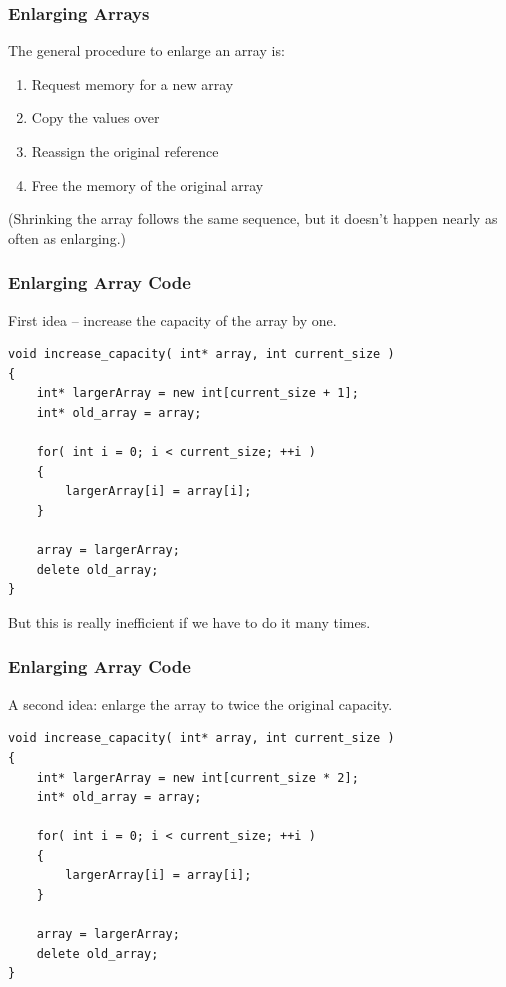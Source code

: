 \begin{frame}
\frametitle{Enlarging Arrays}
The general procedure to enlarge an array is:

\begin{enumerate}
	\item Request memory for a new array
 	\item Copy the values over
	\item Reassign the original reference
	\item Free the memory of the original array
\end{enumerate}

(Shrinking the array follows the same sequence, but it doesn't happen nearly as often as enlarging.)

\end{frame}

\begin{frame}[fragile]
\frametitle{Enlarging Array Code}

First idea -- increase the capacity of the array by one.

\begin{verbatim}
void increase_capacity( int* array, int current_size )
{
    int* largerArray = new int[current_size + 1];
    int* old_array = array;
    
    for( int i = 0; i < current_size; ++i )
    {
        largerArray[i] = array[i];
    }
    
    array = largerArray;
    delete old_array;
}
\end{verbatim}

But this is really inefficient if we have to do it many times.

\end{frame}


\begin{frame}[fragile]
\frametitle{Enlarging Array Code}

A second idea: enlarge the array to twice the original capacity.

\begin{verbatim}
void increase_capacity( int* array, int current_size )
{
    int* largerArray = new int[current_size * 2];
    int* old_array = array;
    
    for( int i = 0; i < current_size; ++i )
    {
        largerArray[i] = array[i];
    }
    
    array = largerArray;
    delete old_array;
}
\end{verbatim}

\end{frame}



